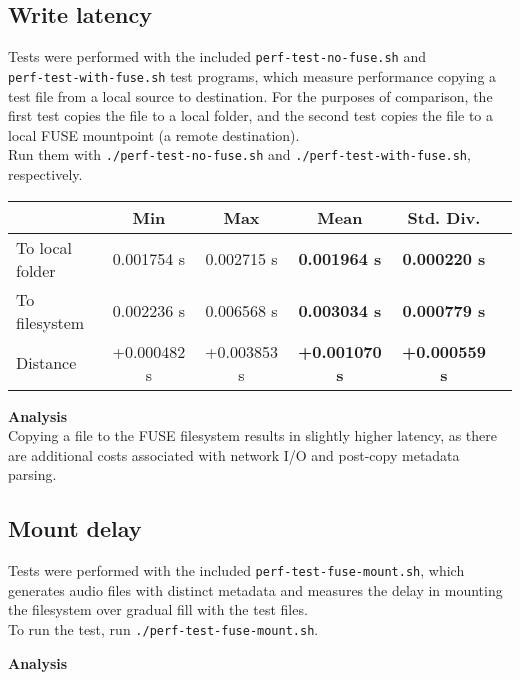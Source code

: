\documentclass{article}
\begin{document}
	\subsection{Write latency}
	Tests were performed with the included \texttt{perf-test-no-fuse.sh} and \\ \texttt{perf-test-with-fuse.sh} test programs, which measure performance copying a test file from a local source to destination. For the purposes of comparison, the first test copies the file to a local folder, and the second test copies the file to a local FUSE mountpoint (a remote destination). \\
	
	\noindent Run them with \texttt{./perf-test-no-fuse.sh} and \texttt{./perf-test-with-fuse.sh}, respectively.
	
	\vspace{0.25cm}
	\noindent 
	
	\vspace{0.5cm}
	\noindent \begin{tabular}{l*{4}{c}r}
		& Min & Max & Mean & Std. Div. & \\
		\hline
		To local folder & 0.001754 s & 0.002715 s & \textbf{0.001964 s} & \textbf{0.000220 s} &  \\
		To filesystem & 0.002236 s & 0.006568 s & \textbf{0.003034 s} & \textbf{0.000779 s} &  \\
		Distance           & +0.000482 s & +0.003853 s & \textbf{+0.001070 s} & \textbf{+0.000559 s} & \\
	\end{tabular}

	\vspace{0.5cm} 
	
	\noindent \textbf{Analysis} \\
	Copying a file to the FUSE filesystem results in slightly higher latency, as there are additional costs associated with network I/O and post-copy metadata parsing.
	
	\subsection{Mount delay}
	Tests were performed with the included \texttt{perf-test-fuse-mount.sh}, which generates audio files with distinct metadata and measures the delay in mounting the filesystem over gradual fill with the test files. \\
	
	\noindent To run the test, run \texttt{./perf-test-fuse-mount.sh}.
	
	\vspace{0.25cm}
	\noindent 
	
	\vspace{0.5cm}
	
	\noindent \textbf{Analysis} \\
\end{document}
